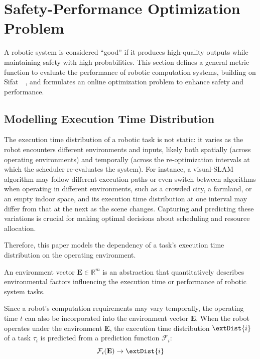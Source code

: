 \section{Safety-Performance Optimization Problem}
	A robotic system is considered ``good'' if it produces high-quality outputs while maintaining safety with high probabilities.
	This section defines a general metric function to evaluate the performance of robotic computation systems, building on Sifat~\etal~\cite{Ash23RAL}, and formulates an online optimization problem to enhance safety and performance.


    \subsection{Modelling Execution Time Distribution}

    \label{section_et_model}

    The execution time distribution of a robotic task is not static: it varies as the robot encounters different environments and inputs, likely both spatially (across operating environments) and temporally (across the re-optimization intervals at which the scheduler re-evaluates the system).
    For instance, a visual-SLAM algorithm may follow different execution paths or even switch between algorithms when operating in different environments, such as a crowded city, a farmland, or an empty indoor space, and its execution time distribution at one interval may differ from that at the next as the scene changes.
    Capturing and predicting these variations is crucial for making optimal decisions about scheduling and resource allocation.

    Therefore, this paper models the dependency of a task's execution time distribution on the operating environment.

\begin{definition}
    An environment vector $\textbf{E} \in \mathbb{R}^m$ is an abstraction that quantitatively describes environmental factors influencing the execution time or performance of robotic system tasks.
\end{definition}

Since a robot's computation requirements may vary temporally, the operating time $t$ can also be incorporated into the environment vector $\textbf{E}$.
When the robot operates under the environment $\textbf{E}$, the execution time distribution $\extDist{i}$ of a task $\tau_i$ is predicted from a prediction function $\mathcal{F}_i$:
\begin{equation}
    \mathcal{F}_i(\textbf{E}) \rightarrow \extDist{i}
    \label{eq: et_predict}
\end{equation}

